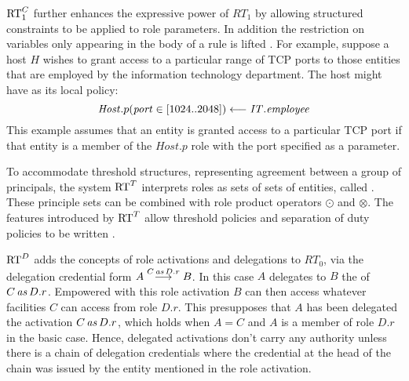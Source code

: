 $\RT_1^C$ further enhances the expressive power of $RT_1$ by allowing
structured constraints to be applied to role parameters. In addition the
restriction on variables only appearing in the body of a rule is lifted
\cite{Li:DCFTML,Li:RRBTMF}. For example, suppose a host $H$ wishes to grant
access to a particular range of TCP ports to those entities that are employed
by the information technology department. The host might have as its local
policy:
$$\cred{\mathit{Host}.p(\mathit{port} \in
[1024..2048])}{\mathit{IT}.\mathit{employee}}{}$$ 
This example assumes
that an entity is granted access to a particular TCP port if that
entity is a member of the $\mathit{Host}.p$ role with the port
specified as a parameter.

To accommodate threshold structures, representing agreement between
a group of principals, the system $\RT^T$ interprets roles as sets of
sets of entities, called .  These principle
sets can be combined with role product operators $\odot$ and
$\otimes$.  
%
%
%
%
The features introduced by $\RT^T$ allow threshold policies and separation of
duty policies to be written \cite{Li:DRBTMF}.

$\RT^D$ adds the concepts of role activations and delegations to $RT_0$, via
the delegation credential form $\delcred{A}{B}{\activation{C}{D.r}}$. In this
case $A$ delegates to $B$ the  of
$\activation{C}{D.r}$. Empowered with this role activation $B$ can then access
whatever facilities $C$ can access from role $D.r$. This presupposes that $A$
has been delegated the activation $\activation{C}{D.r}$, which holds when $A =
C$ and $A$ is a member of role $D.r$ in the basic case. Hence, delegated
activations don't carry any authority unless there is a chain of delegation
credentials where the credential at the head of the chain was issued by the
entity mentioned in the role activation.

